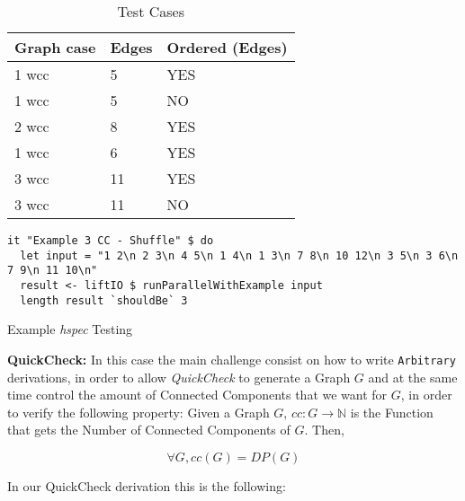 \documentclass[12pt]{article}
\begin{document}
\begin{table}[H]
  \centering
  \begin{tabular}{|l|l|l|}
   \hline
   Graph case & Edges & Ordered (Edges)\\
   \hline
   1 \acrshort{wcc} & 5 & YES \\
   \hline
   1 \acrshort{wcc} & 5 & NO \\
   \hline
   2 \acrshort{wcc} & 8 & YES \\
   \hline
   1 \acrshort{wcc} & 6 & YES \\
   \hline
   3 \acrshort{wcc} & 11 & YES \\
   \hline
   3 \acrshort{wcc} & 11 & NO \\
   \hline
  \end{tabular}
 \caption{Test Cases}
 \label{table:2}
 \end{table}

\begin{listing}[H]
\begin{verbatim}      
it "Example 3 CC - Shuffle" $ do
  let input = "1 2\n 2 3\n 4 5\n 1 4\n 1 3\n 7 8\n 10 12\n 3 5\n 3 6\n 7 9\n 11 10\n"
  result <- liftIO $ runParallelWithExample input
  length result `shouldBe` 3
\end{verbatim}
\caption{Example \textit{hspec} Testing}
\label{src:haskell:6}
\end{listing}

\textbf{QuickCheck:} In this case the main challenge consist on how to write \texttt{Arbitrary} derivations, in order to 
allow \textit{QuickCheck} to generate a Graph $G$ and at the same time control the amount of Connected Components that we want for $G$, 
in order to verify the following property: Given a Graph $G$, $cc : G \to \mathbb{N}$ is the Function that gets the Number of Connected Components of $G$.
Then,

\begin{equation}
  \forall G, cc(G) = DP(G)
\end{equation}

In our QuickCheck derivation this is the following:
\end{document}
